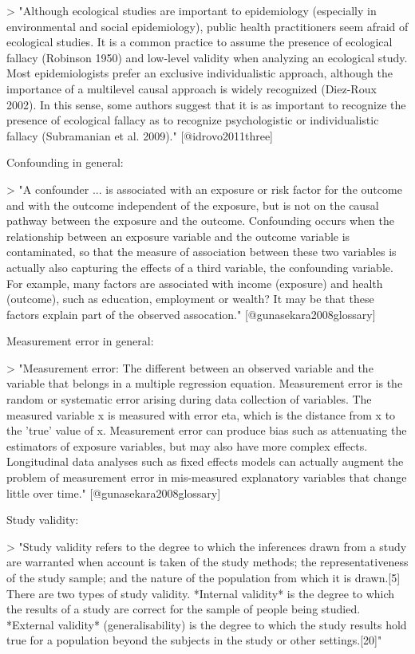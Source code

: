 > "Although ecological studies are important to epidemiology (especially in
environmental and social epidemiology), public health practitioners seem afraid
of ecological studies. It is a common practice to assume the presence of
ecological fallacy (Robinson 1950) and low-level validity when analyzing an
ecological study. Most epidemiologists prefer an exclusive individualistic
approach, although the importance of a multilevel causal approach is widely
recognized (Diez-Roux 2002). In this sense, some authors suggest that it is as
important to recognize the presence of ecological fallacy as to recognize
psychologistic or individualistic fallacy (Subramanian et al. 2009)."
[@idrovo2011three]

Confounding in general: 

> "A confounder ... is associated with an exposure or risk factor for the
outcome and with the outcome independent of the exposure, but is not on the
causal pathway between the exposure and the outcome. Confounding occurs when the
relationship between an exposure variable and the outcome variable is
contaminated, so that the measure of association between these two variables is
actually also capturing the effects of a third variable, the confounding
variable. For example, many factors are associated with income (exposure) and
health (outcome), such as education, employment or wealth? It may be that these
factors explain part of the observed assocation." [@gunasekara2008glossary]

Measurement error in general:

> "Measurement error: The different between an observed variable and the
variable that belongs in a multiple regression equation. Measurement error is
the random or systematic error arising during data collection of variables. The
measured variable x is measured with error eta, which is the distance from x to
the 'true' value of x. Measurement error can produce bias such as attenuating
the estimators of exposure variables, but may also have more complex effects.
Longitudinal data analyses such as fixed effects models can actually augment the
problem of measurement error in mis-measured explanatory variables that change
little over time." [@gunasekara2008glossary]

Study validity: 

> "Study validity refers to the degree to which the inferences drawn from a
study are warranted when account is taken of the study methods; the
representativeness of the study sample; and the nature of the population from
which it is drawn.[5] There are two types of study validity. *Internal validity*
is the degree to which the results of a study are correct for the sample of
people being studied. *External validity* (generalisability) is the degree to
which the study results hold true for a population beyond the subjects in the
study or other settings.[20]"


